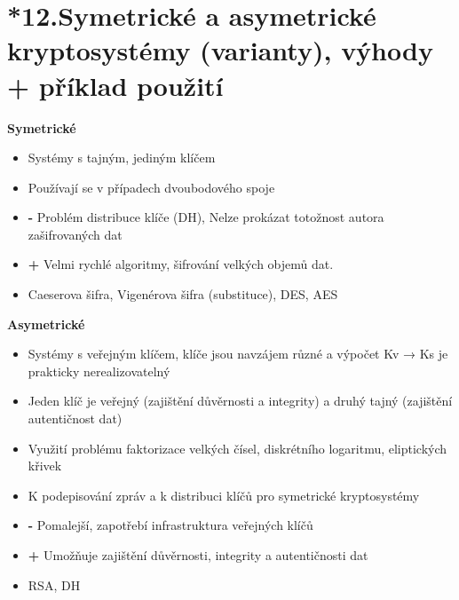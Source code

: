 \section{*12.Symetrické a asymetrické kryptosystémy (varianty), výhody + příklad použití}
\textbf{Symetrické}
\begin{itemize}
    \item Systémy s tajným, jediným klíčem
    \item Používají se v případech dvoubodového spoje
    \item\textbf{  - }Problém distribuce klíče (DH), Nelze prokázat totožnost autora zašifrovaných dat
    \item\textbf{ + }Velmi rychlé algoritmy, šifrování velkých objemů dat.
    \item Caeserova šifra, Vigenérova šifra (substituce), DES, AES
\end{itemize}
\textbf{Asymetrické}
\begin{itemize}
    \item Systémy s veřejným klíčem, klíče jsou navzájem různé a výpočet Kv → Ks je prakticky nerealizovatelný
    \item Jeden klíč je veřejný (zajištění důvěrnosti a integrity)  a druhý tajný (zajištění autentičnost dat)
    \item Využití problému faktorizace velkých čísel, diskrétního logaritmu, eliptických křivek
    \item  K podepisování zpráv a k distribuci klíčů pro symetrické kryptosystémy
    \item\textbf{ - }Pomalejší, zapotřebí infrastruktura veřejných klíčů 
    \item\textbf{ + }Umožňuje zajištění důvěrnosti, integrity a autentičnosti dat 
    \item RSA, DH
\end{itemize}